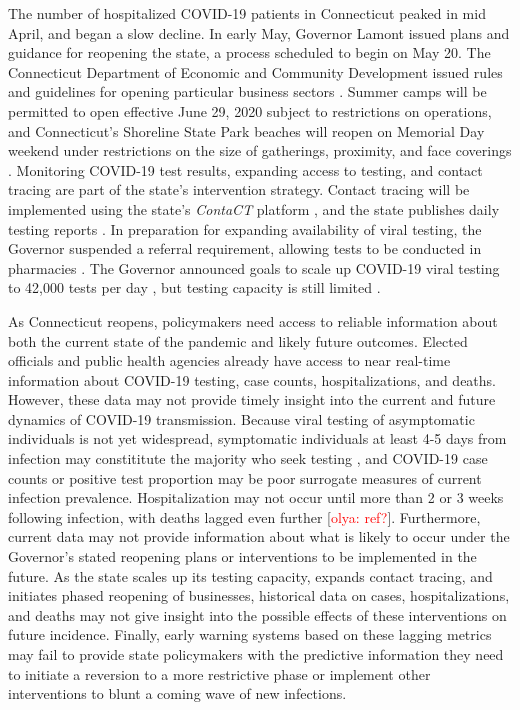\documentclass[11pt]{article}
\newcommand{\comment}[1]{[\textcolor{red}{#1}]}
\begin{document}

The number of hospitalized COVID-19 patients in Connecticut peaked in mid April, and began a slow decline.  In early May, Governor Lamont issued plans and guidance for reopening the state, a process scheduled to begin on May 20. The Connecticut Department of Economic and Community Development issued rules and guidelines for opening particular business sectors \citep{decd2020coronavirus}. Summer camps will be permitted to open effective June 29, 2020 subject to restrictions on operations, and Connecticut's Shoreline State Park beaches will reopen on Memorial Day weekend under restrictions on the size of gatherings, proximity, and face coverings \citep{ct2020parks}.  Monitoring COVID-19 test results, expanding access to testing, and contact tracing are part of the state's intervention strategy.  Contact tracing will be implemented using the state's \emph{ContaCT} platform \citep{ct2020contact}, and the state publishes daily testing reports \citep[e.g.][]{ct2020testing}. In preparation for expanding availability of viral testing, the Governor suspended a referral requirement, allowing tests to be conducted in pharmacies \citep{lamont2020suspension,lamont2020exec7kk}. The Governor announced goals to scale up COVID-19 viral testing to 42,000 tests per day \citep{phaneuf2020lamont}, but testing capacity is still limited \cite{thomas2020surge}. 


As Connecticut reopens, policymakers need access to reliable information about both the current state of the pandemic and likely future outcomes.  Elected officials and public health agencies already have access to near real-time information about COVID-19 testing, case counts, hospitalizations, and deaths.  However, these data may not provide timely insight into the current and future dynamics of COVID-19 transmission.  Because viral testing of asymptomatic individuals is not yet widespread, symptomatic individuals at least 4-5 days from infection may constititute the majority who seek testing \citep{lauer2020incubation, bi2020epidemiology, li2020early, linton2020incubation, he2020estimation, salje2020estimating, wei2020presymptomatic}, and COVID-19 case counts or positive test proportion may be poor surrogate measures of current infection prevalence.  Hospitalization may not occur until more than 2 or 3 weeks following infection, with deaths lagged even further \comment{olya: ref?}.  Furthermore, current data may not provide information about what is likely to occur under the Governor's stated reopening plans or interventions to be implemented in the future. As the state scales up its testing capacity, expands contact tracing, and initiates phased reopening of businesses, historical data on cases, hospitalizations, and deaths may not give insight into the possible effects of these interventions on future incidence.  Finally, early warning systems based on these lagging metrics may fail to provide state policymakers with the predictive information they need to initiate a reversion to a more restrictive phase or implement other interventions to blunt a coming wave of new infections. 
\end{document}
